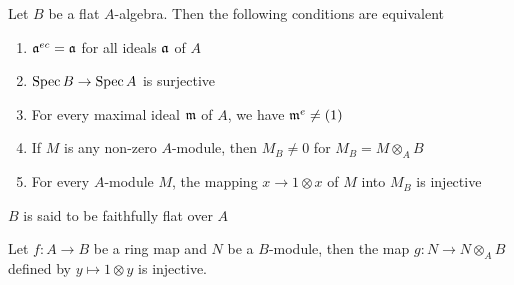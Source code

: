 \begin{problem}
	Let $B$ be a flat $A$-algebra. Then the following conditions are equivalent
	\begin{enumerate}
		\item $\mathfrak{a}^{ec} = \mathfrak{a}$ for all ideals $\mathfrak{a}$ of $A$
		\item $\operatorname{Spec} B \to \operatorname{Spec} A$ is surjective
		\item For every maximal ideal $\mathfrak{m}$ of $A$, we have $\mathfrak{m}^e \neq (1)$
		\item If $M$ is any non-zero $A$-module, then $M_B \neq 0$ for $M_B = M \otimes_A B$
		\item For every $A$-module $M$, the mapping $x \to 1 \otimes x$ of $M$ into $M_B$ is injective
	\end{enumerate}
	
	$B$ is said to be faithfully flat over $A$
\end{problem}

\begin{lemma}
	\label{lemma_2_13}
	Let $f: A \to B$ be a ring map and $N$ be a $B$-module, then the map $g: N \to N \otimes_A B$ defined by $y \mapsto 1 \otimes y$ is injective.
\end{lemma}

